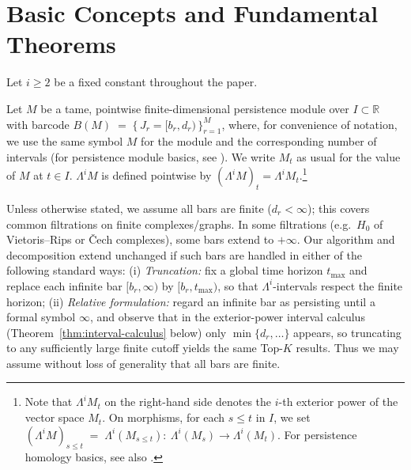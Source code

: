 \documentclass[runningheads]{llncs}
\newcommand{\R}{\mathbb{R}}
\newcommand{\B}{B}
\newcommand{\Lam}{\Lambda}
\newcommand{\Kc}{K_{\text{all}}}
\begin{document}








\section{Basic Concepts and Fundamental Theorems}\label{sec:prelim}
Let $i\ge 2$ be a fixed constant throughout the paper.

Let $M$ be a tame, pointwise finite-dimensional persistence module over
$I \subset \R$ with barcode $\B(M) \;=\; \{\, J_r = [b_r,d_r) \,\}_{r=1}^M$,  where, for convenience of notation, we use the same symbol $M$ for the module and the corresponding number of intervals (for persistence module basics, see \cite{Oudot15,ChazalStructure16}).
We write $M_t$ as usual for the value of $M$ at $t\in I$. 
$\Lambda^i M$ is defined pointwise by $(\Lambda^iM)_t=\Lambda^i M_t$.\footnote{
Note that $\Lambda^i M_t$ on the right-hand side denotes the $i$-th exterior power of the vector space $M_t$.
On morphisms, for each $s\le t$ in $I$, we set
$(\Lambda^i M)_{s\le t} \;=\; \Lambda^i(M_{s\le t}):\ 
\Lambda^i(M_s) \longrightarrow \Lambda^i(M_t).$
For persistence homology basics, see also \cite{EdelsbrunnerHarer10,Oudot15}.
}

Unless otherwise stated, we assume all bars are finite ($d_r<\infty$); this
covers common filtrations on finite complexes/graphs. 
In some filtrations (e.g.\ $H_0$ of Vietoris--Rips or \v{C}ech complexes),
some bars extend to $+\infty$. Our algorithm and decomposition extend
unchanged if such bars are handled in either of the following standard ways:
(i) \emph{Truncation:} fix a global time horizon $t_{\max}$ and replace each
  infinite bar $[b_r,\infty)$ by $[b_r,t_{\max})$, so that $\Lam^i$-intervals
  respect the finite horizon;
(ii) \emph{Relative formulation:} regard an infinite bar as persisting until
  a formal symbol $\infty$, and observe that in the exterior-power interval
  calculus (Theorem~\ref{thm:interval-calculus} below) only $\min\{d_r,\ldots\}$ appears, so truncating to any
  sufficiently large finite cutoff yields the same Top-$K$ results.
Thus we may assume without loss of generality that all bars are finite.
\end{document}
